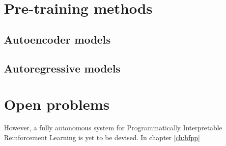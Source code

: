 \section{Pre-training methods}

\subsection{Autoencoder models}

\subsection{Autoregressive models}

\section{Open problems}

However, a fully autonomous system for Programmatically Interpretable Reinforcement Learning is yet to be devised. In chapter \ref{ch:bfpp}